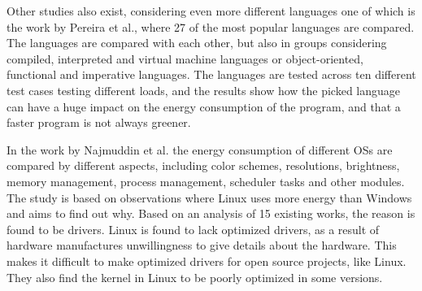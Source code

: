 Other studies also exist, considering even more different languages one of which is the work by Pereira et al.\cite[]{Pereira2017}, where 27 of the most popular languages are compared. The languages are compared with each other, but also in groups considering compiled, interpreted and virtual machine languages or object-oriented, functional and imperative languages. The languages are tested across ten different test cases testing different loads, and the results show how the picked language can have a huge impact on the energy consumption of the program, and that a faster program is not always greener.\newline

In the work by Najmuddin et al.\cite*[]{Najmuddin2021} the energy consumption of different OSs are compared by different aspects, including color schemes, resolutions, brightness, memory management, process management, scheduler tasks and other modules. The study is based on observations where Linux uses more energy than Windows and aims to find out why. Based on an analysis of 15 existing works, the reason is found to be drivers. Linux is found to lack optimized drivers, as a result of hardware manufactures unwillingness to give details about the hardware. This makes it difficult to make optimized drivers for open source projects, like Linux. They also find the kernel in Linux to be poorly optimized in some versions.